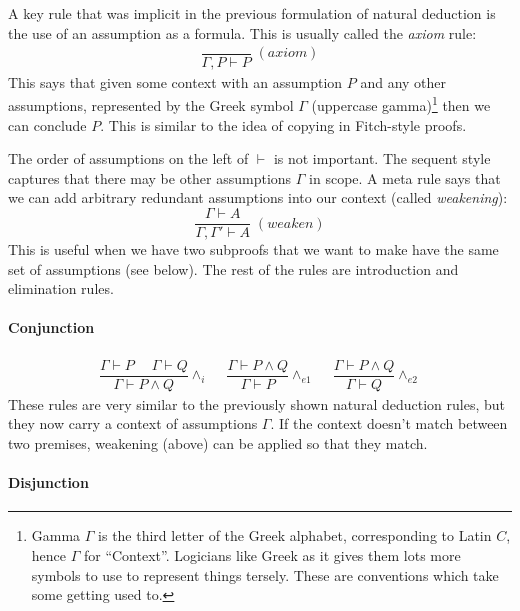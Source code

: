 A key rule that was implicit in the previous formulation of natural
deduction is the use of an assumption as a formula. This is usually
called the \emph{axiom} rule:
%
\begin{align*}
\dfrac{\qquad}{\Gamma, P \vdash P} \; (\textit{axiom})
\end{align*}
%
This says that given some context with an assumption $P$ and any other
assumptions, represented by the Greek symbol $\Gamma$ (uppercase
gamma)\footnote{Gamma $\Gamma$ is the third letter of the Greek
  alphabet, corresponding to Latin $C$, hence $\Gamma$ for
  ``Context''. Logicians like Greek as it gives them lots more symbols
  to use to represent things tersely. These are conventions which take
  some getting used to.} then we can conclude $P$.  This is similar to
the idea of copying in Fitch-style proofs.

The order of assumptions on the left of $\vdash$ is not important.
The sequent style captures that
there may be other assumptions $\Gamma$ in scope.  A meta rule says
that we can add arbitrary redundant assumptions into our context
(called \emph{weakening}):
%
\begin{equation*}
  \dfrac{\Gamma \vdash A}
        {\Gamma, \Gamma' \vdash A} \; (\textit{weaken})
  \end{equation*}
This is useful when we have two subproofs that we want to
make have the same set of assumptions (see below). The rest
of the rules are introduction and elimination rules.

\paragraph{Conjunction}

\begin{align*}
\dfrac{\Gamma \vdash P \quad\; \Gamma \vdash Q}{\Gamma \vdash P \wedge
  Q} {\wedge_i}
\quad\;
\dfrac{\Gamma \vdash P \wedge Q}{\Gamma \vdash P} {\wedge_{e1}}
\quad\;
\dfrac{\Gamma \vdash P \wedge Q}{\Gamma \vdash Q} {\wedge_{e2}}
\end{align*}
%
These rules are very similar to the previously shown natural
deduction rules, but they now carry a context of assumptions
$\Gamma$. If the context doesn't match between
two premises, weakening (above) can be applied so that they match.

\paragraph{Disjunction}

